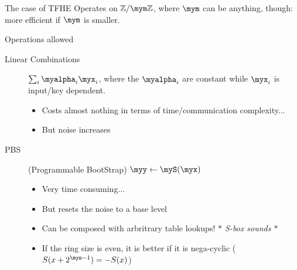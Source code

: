 \documentclass[presentation,aspectratio=1610]{beamer}
\begin{document}
\begin{frame}{The case of TFHE}
  Operates on $\Zmod{\mym}$, where $\mym$ can be anything, though:
  more efficient if $\mym$ is smaller.
  
  \begin{exampleblock}{Operations allowed}
    \begin{description}
    \item[Linear Combinations] $\sum_i \myalpha_i \myx_i$, where the $\myalpha_i$ are constant while $\myx_i$ is input/key dependent.

      \begin{itemize}
      \item Costs almost nothing in terms of time/communication complexity...
      \item But \alert{noise} increases
      \end{itemize}
      \pause
    \item[PBS] (\alert{P}rogrammable \alert{B}oot\alert{S}trap) \hspace{0.5cm} $\myy \gets \myS(\myx)$
      \begin{itemize}
      \item Very time consuming...
      \item But resets the noise to a \alert{base level} \pause
      \item Can be composed with \alert{arbritrary table lookups!} \pause \hfill {\emph{\color{gray}$*$ S-box sounds $*$}}
      \item If the ring size is even, it is better if it is \alert{nega-cyclic} ($S(x + 2^{\myn-1}) = - S(x)$)
      \end{itemize}
    \end{description}
  \end{exampleblock}
\end{frame}
\end{document}
